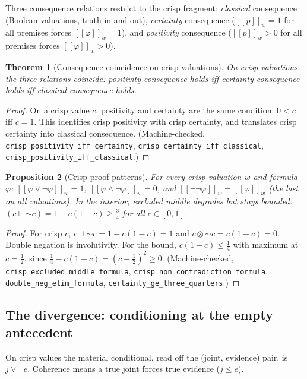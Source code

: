 \documentclass[11pt,a4paper]{article}
\newtheorem{theorem}{Theorem}[section]
\newtheorem{proposition}[theorem]{Proposition}
\newcommand{\negc}{\mathord{\sim}}
\newcommand{\conjc}{\otimes}
\newcommand{\disjc}{\sqcup}
\newcommand{\evalc}[2]{[\![ {#2} ]\!]_{#1}}
\begin{document}
Three consequence relations restrict to the crisp fragment:
\emph{classical} consequence (Boolean valuations, truth in and out),
\emph{certainty} consequence ($\evalc{w}{p} = 1$ for all premises
forces $\evalc{w}{\varphi} = 1$), and \emph{positivity} consequence
($\evalc{w}{p} > 0$ for all premises forces
$\evalc{w}{\varphi} > 0$).

\begin{theorem}[Consequence coincidence on crisp valuations]
\label{thm:crisp-coincide}
On crisp valuations the three relations coincide:
positivity consequence holds iff certainty consequence holds iff
classical consequence holds.
\end{theorem}
\begin{proof}
On a crisp value $c$, positivity and certainty are the same condition:
$0 < c$ iff $c = 1$.
This identifies crisp positivity with crisp certainty, and
 translates crisp certainty into classical
consequence.
(Machine-checked, \texttt{crisp\_positivity\_iff\_certainty},
\texttt{crisp\_certainty\_iff\_classical},
\texttt{crisp\_positivity\_iff\_classical}.)
\end{proof}

\begin{proposition}[Crisp proof patterns]
\label{prop:crisp-patterns}
For every crisp valuation $w$ and formula $\varphi$:
$\evalc{w}{\varphi \vee \neg\varphi} = 1$,
$\evalc{w}{\varphi \wedge \neg\varphi} = 0$, and
$\evalc{w}{\neg\neg\varphi} = \evalc{w}{\varphi}$ (the last on all
valuations).
In the interior, excluded middle degrades but stays bounded:
$(c \disjc \negc c) = 1 - c(1-c) \geq \tfrac34$ for all
$c \in [0,1]$.
\end{proposition}
\begin{proof}
For crisp $c$, $c \disjc \negc c = 1 - c(1-c) = 1$ and
$c \conjc \negc c = c(1-c) = 0$.
Double negation is involutivity.
For the bound, $c(1-c) \leq \tfrac14$ with maximum at $c = \tfrac12$,
since $\tfrac14 - c(1-c) = (c - \tfrac12)^2 \geq 0$.
(Machine-checked, \texttt{crisp\_excluded\_middle\_formula},
\texttt{crisp\_non\_contradiction\_formula},
\texttt{double\_neg\_elim\_formula},
\texttt{certainty\_ge\_three\_quarters}.)
\end{proof}

\subsection{The divergence: conditioning at the empty antecedent}

On crisp values the material conditional, read off the (joint,
evidence) pair, is $j \vee \lnot e$.
Coherence means a true joint forces true evidence ($j \leq e$).
\end{document}
